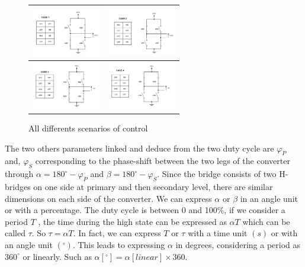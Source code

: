 \documentclass[conference]{IEEEtran}
\begin{document}
\begin{figure}[htbp]
	\centering
	\begin{tabular}{|c|c|}
		\hline
		\includegraphics[width=30mm]{images/3.png} &
		\includegraphics[width=30mm]{images/4.png} \\
		\hline
		\includegraphics[width=30mm]{images/5.png} &
		\includegraphics[width=30mm]{images/6.png} \\
		\hline
	\end{tabular}
	\caption{All differents scenarios of control}
	\label{fig}
\end{figure}

The two others parameters linked and deduce from the two duty cycle are \(\varphi_P\) and,  \(\varphi_S\)
corresponding to the phase-shift between the two legs of the converter through \(\alpha = 180^\circ - \varphi_P\) and \(\beta = 180^\circ - \varphi_S\). Since the bridge consists of two H-bridges on one side
at primary and then secondary level, there are similar dimensions on each side of the
converter.
We can express \(\alpha\) or \(\beta\) in an angle unit or with a percentage. The duty cycle is between
0 and 100\%, if we consider a period \(T\) , the time during the high state can be expressed
as \(\alpha T\) which can be called \(\tau\). So \(\tau = \alpha T\). In fact, we can express \(T\) or \(\tau\) with a time unit
\( \left(s\right) \) or with an angle unit \( (^{\circ}) \). This leads to expressing \( \alpha \) in degrees, considering a period as \( 360^{\circ} \) or linearly. Such as \(\alpha \left[^{\circ}\right] = \alpha \left[linear\right] \times 360\).
\end{document}
